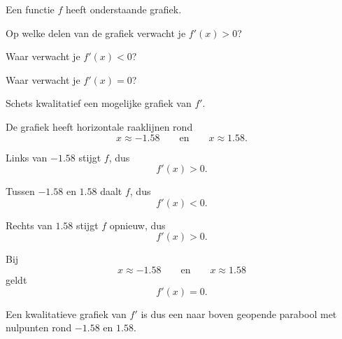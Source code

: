 \documentclass{ximera}
\begin{document}
\begin{oefening}{\oefU\ESS}

Een functie $f$ heeft onderstaande grafiek.

\begin{center}
\end{center}

\begin{question}
Op welke delen van de grafiek verwacht je $f'(x)>0$?
\end{question}

\begin{question}
Waar verwacht je $f'(x)<0$?
\end{question}

\begin{question}
Waar verwacht je $f'(x)=0$?
\end{question}

\begin{question}
Schets kwalitatief een mogelijke grafiek van $f'$.
\end{question}

\begin{oplossing}

De grafiek heeft horizontale raaklijnen rond
\[
x\approx -1.58
\qquad\text{en}\qquad
x\approx 1.58.
\]

Links van $-1.58$ stijgt $f$, dus
\[
f'(x)>0.
\]

Tussen $-1.58$ en $1.58$ daalt $f$, dus
\[
f'(x)<0.
\]

Rechts van $1.58$ stijgt $f$ opnieuw, dus
\[
f'(x)>0.
\]

Bij
\[
x\approx -1.58
\qquad\text{en}\qquad
x\approx 1.58
\]
geldt
\[
f'(x)=0.
\]

Een kwalitatieve grafiek van $f'$ is dus een naar boven geopende parabool
met nulpunten rond $-1.58$ en $1.58$.

\end{oplossing}

\end{oefening}
\end{document}
